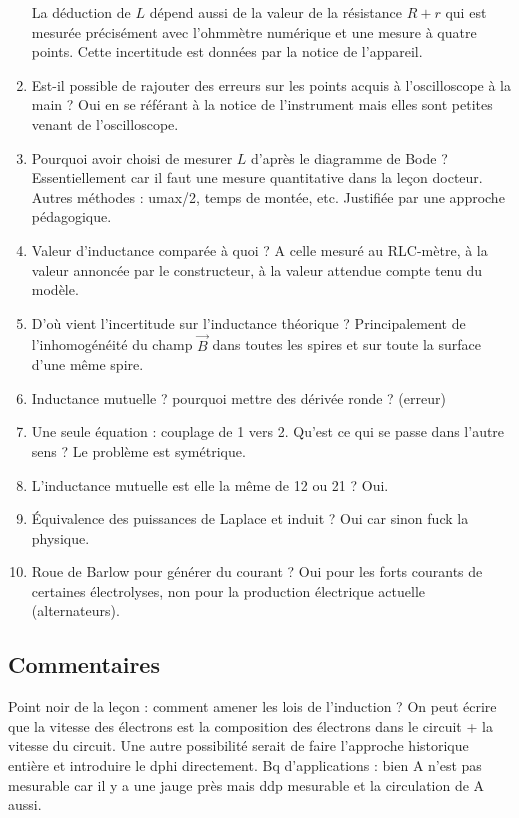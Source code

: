 \begin{enumerate}
La déduction de $L$ dépend aussi de la valeur de la résistance $R + r$ qui est mesurée précisément avec l'ohmmètre numérique et une mesure à quatre points.
Cette incertitude est données par la notice de l'appareil.
\item Est-il possible de rajouter des erreurs sur les points acquis à l'oscilloscope à la main ?
Oui en se référant à la notice de l'instrument mais elles sont petites venant de l'oscilloscope.
\item Pourquoi avoir choisi de mesurer $L$ d'après le diagramme de Bode ?
Essentiellement car il faut une mesure quantitative dans la leçon docteur.
Autres méthodes : umax/2, temps de montée, etc.
Justifiée par une approche pédagogique.
\item Valeur d'inductance comparée à quoi ? A celle mesuré au RLC-mètre, à la valeur annoncée par le constructeur, à la valeur attendue compte tenu du modèle.
\item D'où vient l'incertitude sur l'inductance théorique ? Principalement de l'inhomogénéité du champ $\overrightarrow{B}$ dans toutes les spires et sur toute la surface d'une même spire.
\item Inductance mutuelle ? pourquoi mettre des dérivée ronde ? (erreur)
\item Une seule équation : couplage de 1 vers 2. Qu'est ce qui se passe dans l'autre sens ?
Le problème est symétrique.
\item L'inductance mutuelle est elle la même de 12 ou 21 ? Oui.
\item Équivalence des puissances de Laplace et induit ? Oui car sinon fuck la physique.
\item Roue de Barlow pour générer du courant ? Oui pour les forts courants de certaines électrolyses, non pour la production électrique actuelle (alternateurs).
\end{enumerate}

\subsection*{Commentaires}

Point noir de la leçon : comment amener les lois de l'induction ?
On peut écrire que la vitesse des électrons est la composition des électrons dans le circuit + la vitesse du circuit.
Une autre possibilité serait de faire l'approche historique entière et introduire le dphi directement.
Bq d'applications : bien
A n'est pas mesurable car il y a une jauge près mais ddp mesurable et la circulation de A aussi.
\newpage